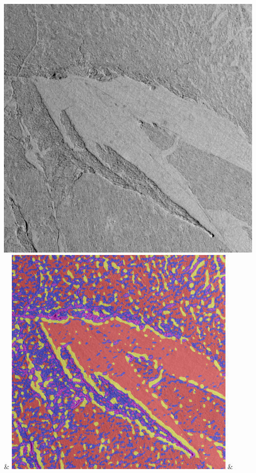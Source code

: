 \begin{table}[h!]
\begin{tabularx}{\textwidth}
		\includegraphics[width=0.9\linewidth]{images/p03/p03_03.png} &
		\includegraphics[width=0.9\linewidth]{images/gen/spatial_weight/p03_03.png_0.00.png} &

\end{tabularx}
\end{table}
